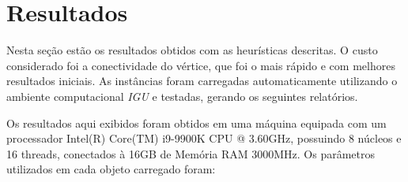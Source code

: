 \documentclass[conference,compsoc]{IEEEtran}
\begin{document}
\section{Resultados}

Nesta seção estão os resultados obtidos com as heurísticas descritas. O custo considerado foi a conectividade do vértice, que foi o mais rápido e com melhores resultados iniciais. As instâncias foram carregadas automaticamente utilizando o ambiente computacional \textit{IGU} e testadas, gerando os seguintes relatórios.

Os resultados aqui exibidos foram obtidos em uma máquina equipada com um processador Intel(R) Core(TM) i9-9900K CPU @ 3.60GHz, possuindo 8 núcleos e 16 threads, conectados à 16GB de Memória RAM 3000MHz. Os parâmetros utilizados em cada objeto carregado foram:
\end{document}
